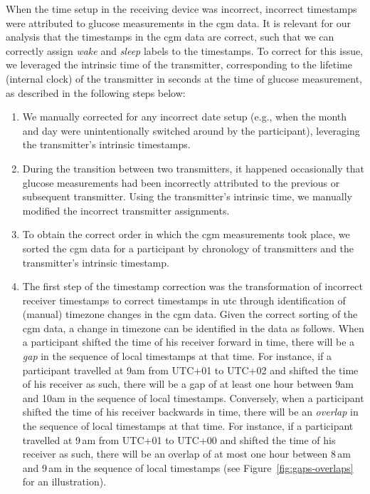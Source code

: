 \documentclass[11pt,a4paper]{article}
\begin{document}
\begin{enumerate}[label=\textbf{\arabic*}.]
When the time setup in the receiving device was incorrect, incorrect timestamps were attributed to glucose measurements in the \gls{cgm} data. It is relevant for our analysis that the timestamps in the \gls{cgm} data are correct, such that we can correctly assign \textit{wake} and \textit{sleep} labels to the timestamps. To correct for this issue, we leveraged the intrinsic time of the transmitter, corresponding to the lifetime (internal clock) of the transmitter in seconds at the time of glucose measurement, as described in the following steps below:
\begin{enumerate}
    \item We manually corrected for any incorrect date setup (e.g., when the month and day were unintentionally switched around by the participant), leveraging the transmitter's intrinsic timestamps.
    \item During the transition between two transmitters, it happened occasionally that glucose measurements had been incorrectly attributed to the previous or subsequent transmitter. Using the transmitter's intrinsic time, we manually modified the incorrect transmitter assignments.
    \item To obtain the correct order in which the \gls{cgm} measurements took place, we sorted the \gls{cgm} data for a participant by chronology of transmitters and the transmitter's intrinsic timestamp.\label{it:sort}
    \item The first step of the timestamp correction was the transformation of incorrect receiver timestamps to correct timestamps in \gls{utc} through identification of (manual) timezone changes in the \gls{cgm} data. Given the correct sorting of the \gls{cgm} data, a change in timezone can be identified in the data as follows. When a participant shifted the time of his receiver forward in time, there will be a \textit{gap} in the sequence of local timestamps at that time. For instance, if a participant travelled at 9am from UTC+01 to UTC+02 and shifted the time of his receiver as such, there will be a gap of at least one hour between 9am and 10am in the sequence of local timestamps. Conversely, when a participant shifted the time of his receiver backwards in time, there will be an \textit{overlap} in the sequence of local timestamps at that time. For instance, if a participant travelled at 9\,am from UTC+01 to UTC+00 and shifted the time of his receiver as such, there will be an overlap of at most one hour between 8\,am and 9\,am in the sequence of local timestamps (see Figure~\ref{fig:gaps-overlaps} for an illustration). 
    

\end{enumerate}
\end{enumerate}
\end{document}
